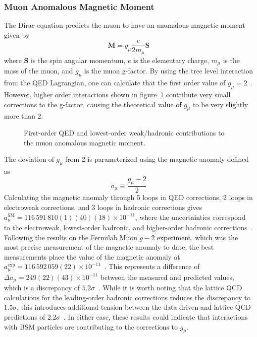 \subsubsection{Muon Anomalous Magnetic Moment} \label{sec:gminus2}
The Dirac equation predicts the muon to have an anomalous magnetic moment given by
\begin{equation}
	\mathbf{M}=g_\mu\frac{e}{2m_\mu}\mathbf{S}
\end{equation}
where $\mathbf{S}$ is the spin angular momentum, $e$ is the elementary charge, $m_\mu$ is the mass of the muon, and $g_\mu$ is the muon g-factor. By using the tree level interaction from the QED Lagrangian, one can calculate that the first order value of $g_\mu=2$~\cite{gminus2_slides}. However, higher order interactions shown in figure~\ref{fig:muon_magnetic_moment} contribute very small corrections to the g-factor, causing the theoretical value of $g_\mu$ to be very slightly more than 2.
\begin{figure}[htb!]
	\begingroup
	
	
	
	\endgroup
	\caption[First-order QED and lowest-order weak/hadronic contributions to the muon anomalous magnetic moment.]{First-order QED and lowest-order weak/hadronic contributions to the muon anomalous magnetic moment.}
	\label{fig:muon_magnetic_moment}
\end{figure}
The deviation of $g_\mu$ from 2 is parameterized using the magnetic anomaly defined as
\begin{equation}
	a_\mu\equiv\frac{g_\mu-2}{2}
\end{equation}
Calculating the magnetic anomaly through 5 loops in QED corrections, 2 loops in electroweak corrections, and 3 loops in hadronic corrections gives $a_\mu^\text{SM}=116\,591\,810(1)(40)(18)\times10^{-11}$, where the uncertainties correspond to the electroweak, lowest-order hadronic, and higher-order hadronic corrections~\cite{pdg2024}. Following the results on the Fermilab Muon $g-2$ experiment, which was the most precise measurement of the magnetic anomaly to date, the best measurements place the value of the magnetic anomaly at $a_\mu^\text{exp}=116\,592\,059(22)\times10^{-11}$~\cite{gminus2}. This represents a difference of $\Delta a_\mu=249(22)(43)\times10^{-11}$ between the measured and predicted values, which is a discrepancy of $5.2\sigma$~\cite{pdg2024}. While it is worth noting that the lattice QCD calculations for the leading-order hadronic corrections reduces the discrepancy to $1.5\sigma$, this introduces additional tension between the data-driven and lattice QCD predictions of $2.2\sigma$~\cite{gminus2_latticeqcd}. In either case, these results could indicate that interactions with BSM particles are contributing to the corrections to $g_\mu$.

